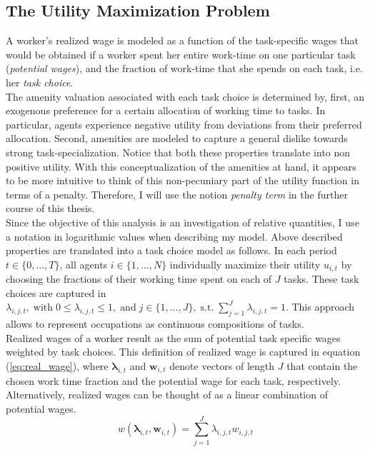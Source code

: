 \documentclass[../main.tex]{subfiles}
\begin{document}
\subsection{The Utility Maximization Problem} \label{sec:utility-max-problem}
A worker's realized wage is modeled as a function of the task-specific wages that would be obtained if a worker spent her entire work-time on one particular task (\textit{potential wages}), and the fraction of work-time that she spends on each task, i.e. her \textit{task choice}.
\\
The amenity valuation associated with each task choice is determined by, first, an exogenous preference for a certain allocation of working time to tasks. In particular, agents experience negative utility from deviations from their preferred allocation. Second, amenities are modeled to capture a general dislike towards strong task-specialization. Notice that both these properties translate into non positive utility. With this conceptualization of the amenities at hand, it appears to be more intuitive to think of this non-pecuniary part of the utility function in terms of a penalty. Therefore, I will use the notion \textit{penalty term} in the further course of this thesis. 
\\
Since the objective of this analysis is an investigation of relative quantities, I use a notation in logarithmic values when describing my model. Above described properties are translated into a task choice model as follows. In each period $t \in \{0, ..., T\}$, all agents $i \in \{1, ..., N\}$ individually maximize their utility $u_{i,t}$ by choosing the fractions of their working time spent on each of $J$ tasks. These task choices are captured in $\lambda_{i,j,t}, \; \text{with} \; 0 \leq \lambda_{i,j,t} \leq 1, \; \text{and} \;j \in \{1, ..., J\}, \; \text{s.t.} \; \sum^J_{j=1} \lambda_{i,j,t} = 1$. This approach allows to represent occupations as continuous compositions of tasks.
\\ 
Realized wages of a worker result as the sum of potential task specific wages weighted by task choices. This definition of realized wage is captured in equation (\ref{eq:real_wage}), where $\boldsymbol{\lambda}_{i,t}$ and $\boldsymbol{w}_{i,t}$ denote vectors of length $J$ that contain the chosen work time fraction and the potential wage for each task, respectively. Alternatively, realized wages can be thought of as a linear combination of potential wages.
\begin{equation}\label{eq:real_wage}
	w(\boldsymbol{\lambda}_{i,t}, \boldsymbol{w}_{i,t}) = \sum^J_{j=1} \lambda_{i,j,t} w_{i,j,t}
\end{equation}
\end{document}
